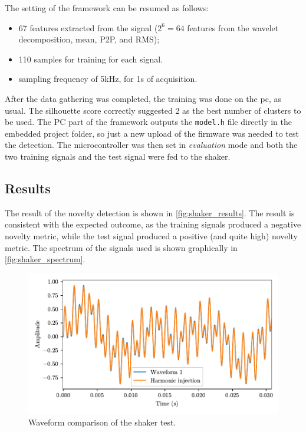 The setting of the framework can be resumed as follows:
\begin{itemize}
    \item 67 features extracted from the signal ($2^6=64$ features from the wavelet decomposition, mean, P2P, and RMS);
    \item 110 samples for training for each signal.
    \item sampling frequency of 5kHz, for 1s of acquisition.
\end{itemize}

After the data gathering was completed, the training was done on the \gls{pc}, as usual. The silhouette score correctly suggested 2 as the best number of clusters to be used. The PC part of the framework outputs the \texttt{model.h} file directly in the embedded project folder, so just a new upload of the firmware was needed to test the detection. The microcontroller was then set in \emph{evaluation} mode and both the two training signals and the test signal were fed to the shaker. 

\subsection{Results}
The result of the novelty detection is shown in \autoref{fig:shaker_results}. The result is consistent with the expected outcome, as the training signals produced a negative novelty metric, while the test signal produced a positive (and quite high) novelty metric. The spectrum of the signals used is shown graphically in \autoref{fig:shaker_spectrum}.

\begin{figure}
    \centering
    \includegraphics{Images/shaker/Figure_1.pdf}
    \caption{Waveform comparison of the shaker test.}
    \label{fig:shaker}
\end{figure}


